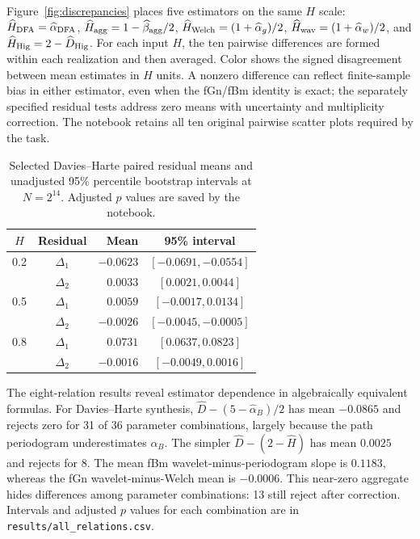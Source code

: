 \documentclass[12pt,twocolumn]{article}
\begin{document}
Figure~\ref{fig:discrepancies} places five estimators on the same $H$ scale: $\widehat H_{\rm DFA}=\widehat\alpha_{\rm DFA}$, $\widehat H_{\rm agg}=1-\widehat\beta_{\rm agg}/2$, $\widehat H_{\rm Welch}=(1+\widehat\alpha_g)/2$, $\widehat H_{\rm wav}=(1+\widehat\alpha_w)/2$, and $\widehat H_{\rm Hig}=2-\widehat D_{\rm Hig}$. For each input $H$, the ten pairwise differences are formed within each realization and then averaged. Color shows the signed disagreement between mean estimates in $H$ units. A nonzero difference can reflect finite-sample bias in either estimator, even when the fGn/fBm identity is exact; the separately specified residual tests address zero means with uncertainty and multiplicity correction. The notebook retains all ten original pairwise scatter plots required by the task.

\begin{table}[t]
\caption{Selected Davies--Harte paired residual means and unadjusted 95\% percentile bootstrap intervals at $N=2^{14}$. Adjusted $p$ values are saved by the notebook.}
\label{tab:intervals}
\centering\small
\begin{tabular}{ccrc}
\toprule
$H$ & Residual & Mean & 95\% interval\\
\midrule
0.2 & $\Delta_1$ & $-0.0623$ & $[-0.0691,-0.0554]$\\
    & $\Delta_2$ & $0.0033$ & $[0.0021,0.0044]$\\
0.5 & $\Delta_1$ & $0.0059$ & $[-0.0017,0.0134]$\\
    & $\Delta_2$ & $-0.0026$ & $[-0.0045,-0.0005]$\\
0.8 & $\Delta_1$ & $0.0731$ & $[0.0637,0.0823]$\\
    & $\Delta_2$ & $-0.0016$ & $[-0.0049,0.0016]$\\
\bottomrule
\end{tabular}
\end{table}

The eight-relation results reveal estimator dependence in algebraically equivalent formulas. For Davies--Harte synthesis, $\widehat D-(5-\widehat\alpha_B)/2$ has mean $-0.0865$ and rejects zero for 31 of 36 parameter combinations, largely because the path periodogram underestimates $\alpha_B$. The simpler $\widehat D-(2-\widehat H)$ has mean $0.0025$ and rejects for 8. The mean fBm wavelet-minus-periodogram slope is $0.1183$, whereas the fGn wavelet-minus-Welch mean is $-0.0006$. This near-zero aggregate hides differences among parameter combinations: 13 still reject after correction. Intervals and adjusted $p$ values for each combination are in \texttt{results/all\_relations.csv}.
\end{document}
